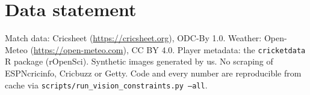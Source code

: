 \documentclass[11pt]{article}
\begin{document}
\section{Data statement}
Match data: Cricsheet (\url{https://cricsheet.org}), ODC-By 1.0. Weather: Open-Meteo
(\url{https://open-meteo.com}), CC BY 4.0. Player metadata: the \texttt{cricketdata} R package
(rOpenSci). Synthetic images generated by us. No scraping of ESPNcricinfo, Cricbuzz or Getty. Code and
every number are reproducible from cache via \texttt{scripts/run\_vision\_constraints.py --all}.



\end{document}
